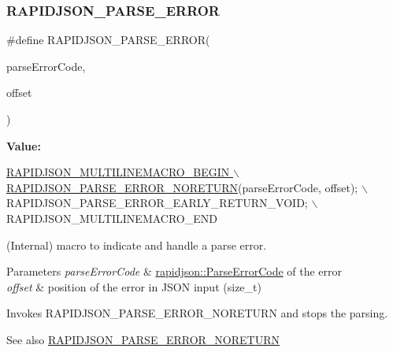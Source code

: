 \subsubsection{\texorpdfstring{R\+A\+P\+I\+D\+J\+S\+O\+N\+\_\+\+P\+A\+R\+S\+E\+\_\+\+E\+R\+R\+OR}{RAPIDJSON\_PARSE\_ERROR}\hspace{0.1cm}{\footnotesize\ttfamily [2/2]}}
{\footnotesize\ttfamily \#define R\+A\+P\+I\+D\+J\+S\+O\+N\+\_\+\+P\+A\+R\+S\+E\+\_\+\+E\+R\+R\+OR(\begin{DoxyParamCaption}\item[{}]{parse\+Error\+Code,  }\item[{}]{offset }\end{DoxyParamCaption})}

{\bfseries Value\+:}
\begin{DoxyCode}
\hyperlink{group__RAPIDJSON__ERRORS_ga7f8c4265b2edda78568ae3338aaf1461}{RAPIDJSON\_MULTILINEMACRO\_BEGIN \(\backslash\)}
\hyperlink{group__RAPIDJSON__ERRORS_ga7f8c4265b2edda78568ae3338aaf1461}{    RAPIDJSON\_PARSE\_ERROR\_NORETURN}(parseErrorCode, offset); \(\backslash\)
    RAPIDJSON\_PARSE\_ERROR\_EARLY\_RETURN\_VOID; \(\backslash\)
    RAPIDJSON\_MULTILINEMACRO\_END
\end{DoxyCode}


(Internal) macro to indicate and handle a parse error. 


\begin{DoxyParams}{Parameters}
{\em parse\+Error\+Code} & \hyperlink{group__RAPIDJSON__ERRORS_ga8d4b32dfc45840bca189ade2bbcb6ba7}{rapidjson\+::\+Parse\+Error\+Code} of the error \\
\hline
{\em offset} & position of the error in J\+S\+ON input ({\ttfamily size\+\_\+t})\\
\hline
\end{DoxyParams}
Invokes R\+A\+P\+I\+D\+J\+S\+O\+N\+\_\+\+P\+A\+R\+S\+E\+\_\+\+E\+R\+R\+O\+R\+\_\+\+N\+O\+R\+E\+T\+U\+RN and stops the parsing.

\begin{DoxySeeAlso}{See also}
\hyperlink{group__RAPIDJSON__ERRORS_ga7f8c4265b2edda78568ae3338aaf1461}{R\+A\+P\+I\+D\+J\+S\+O\+N\+\_\+\+P\+A\+R\+S\+E\+\_\+\+E\+R\+R\+O\+R\+\_\+\+N\+O\+R\+E\+T\+U\+RN} 
\end{DoxySeeAlso}
\mbox{\label{group__RAPIDJSON__ERRORS_ga7f8c4265b2edda78568ae3338aaf1461}} 
